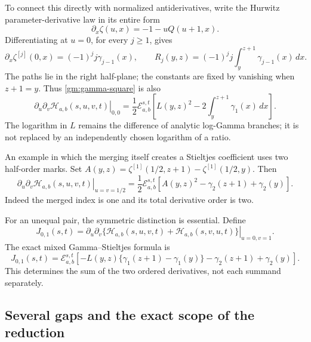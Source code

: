 To connect this directly with normalized antiderivatives, write the
Hurwitz parameter-derivative law in its entire form
\[
 \partial_x\zeta(u,x)=-1-uQ(u+1,x).
\]
Differentiating at \(u=0\), for every \(j\ge1\), gives
\begin{equation}\label{gm:primitive}
 \partial_x\zeta^{[j]}(0,x)=(-1)^j j\gamma_{j-1}(x),\qquad
 R_j(y,z)=(-1)^j j\int_y^{z+1}\gamma_{j-1}(x)\,dx.
\end{equation}
The paths lie in the right half-plane; the constants are fixed by
vanishing when \(z+1=y\).  Thus \eqref{gm:gamma-square} is also
\begin{equation}\label{gm:gamma-integral}
 \left.\partial_u\partial_v\mathcal H_{a,b}(s,u,v,t)\right|_{0,0}
  =\frac12\mathcal E_{a,b}^{s,t}\!\left[
       L(y,z)^2-2\int_y^{z+1}\gamma_1(x)\,dx\right].
\end{equation}
The logarithm in \(L\) remains the difference of analytic log-Gamma
branches; it is not replaced by an independently chosen logarithm of
a ratio.

An example in which the merging itself creates a Stieltjes coefficient
uses two half-order marks.  Set
\(A(y,z)=\zeta^{[1]}(1/2,z+1)-\zeta^{[1]}(1/2,y)\).
Then
\begin{equation}\label{gm:half-pair}
 \left.\partial_u\partial_v\mathcal H_{a,b}(s,u,v,t)
                                      \right|_{u=v=1/2}
 =\frac12\mathcal E_{a,b}^{s,t}
          [A(y,z)^2-\gamma_2(z+1)+\gamma_2(y)].
\end{equation}
Indeed the merged index is one and its total derivative order is two.

For an unequal pair, the symmetric distinction is essential.  Define
\[
 J_{0,1}(s,t)=\left.\partial_u\partial_v
 \bigl\{\mathcal H_{a,b}(s,u,v,t)+\mathcal H_{a,b}(s,v,u,t)\bigr\}
                                                    \right|_{u=0,v=1}.
\]
The exact mixed Gamma--Stieltjes formula is
\begin{equation}\label{gm:mixed-pair}
 J_{0,1}(s,t)=\mathcal E_{a,b}^{s,t}\!\left[
 -L(y,z)\{\gamma_1(z+1)-\gamma_1(y)\}
                         -\gamma_2(z+1)+\gamma_2(y)\right].
\end{equation}
This determines the sum of the two ordered derivatives, not each
summand separately.

\subsection{Several gaps and the exact scope of the reduction}

